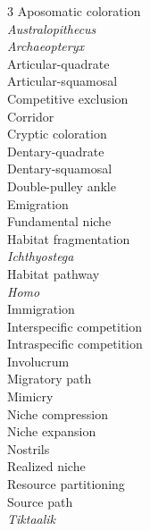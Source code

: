 
\begin{multicols}{3}
Aposomatic coloration \\
\textit{Australopithecus} \\
\emph{Archaeopteryx} \\
Articular-quadrate \\
Articular-squamosal \\
Competitive exclusion \\
Corridor \\
Cryptic coloration \\
Dentary-quadrate \\
Dentary-squamosal \\
Double-pulley ankle \\
Emigration \\
Fundamental niche \\
Habitat fragmentation \\
\emph{Ichthyostega} \\
Habitat pathway \\	
\textit{Homo} \\
Immigration \\
Interspecific competition \\
Intraspecific competition \\
Involucrum \\
Migratory path \\
Mimicry \\
Niche compression \\
Niche expansion \\
Nostrils \\
Realized niche \\
Resource partitioning \\
Source path \\
\emph{Tiktaalik}
\end{multicols}
